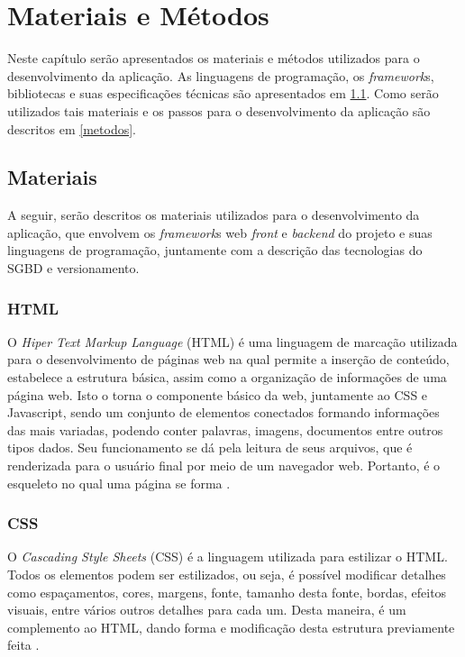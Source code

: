 \chapter{Materiais e Métodos}\label{chp:LABEL_CHP_3}
Neste capítulo serão apresentados os materiais e métodos utilizados para o desenvolvimento da aplicação. As linguagens de programação, os \textit{framework}s, bibliotecas e suas especificações técnicas são apresentados em \ref{materiais}. Como serão utilizados tais materiais e os passos para o desenvolvimento da aplicação são descritos em \ref{metodos}.

\section{Materiais} \label{materiais}
A seguir, serão descritos os materiais utilizados para o desenvolvimento da aplicação, que envolvem os \textit{framework}s web \textit{front} e \textit{backend} do projeto e suas linguagens de programação, juntamente com a descrição das tecnologias do SGBD e versionamento.

\subsection{HTML}
O \textit{Hiper Text Markup Language} (HTML) é uma linguagem de marcação utilizada para o desenvolvimento de páginas web na qual permite a inserção de conteúdo, estabelece a estrutura básica, assim como a organização de informações de uma página web. Isto o torna o componente básico da web, juntamente ao CSS e Javascript, sendo um conjunto de elementos conectados formando informações das mais variadas, podendo conter palavras, imagens, documentos entre outros tipos dados. Seu funcionamento se dá pela leitura de seus arquivos, que é renderizada para o usuário final por meio de um navegador web. Portanto, é o esqueleto no qual uma página se forma \cite{FLANAGAN}.

\subsection{CSS}
O \textit{Cascading Style Sheets} (CSS) é a linguagem utilizada para estilizar o HTML. Todos os elementos podem ser estilizados, ou seja, é possível modificar detalhes como espaçamentos, cores, margens, fonte, tamanho desta fonte, bordas, efeitos visuais, entre vários outros detalhes para cada um. Desta maneira, é um complemento ao HTML, dando forma e modificação desta estrutura previamente feita \cite{FLANAGAN}.

